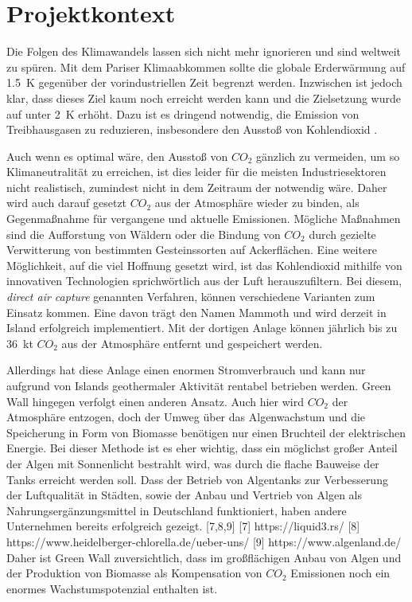 \section{Projektkontext}

Die Folgen des Klimawandels lassen sich nicht mehr ignorieren und sind weltweit zu spüren. Mit dem Pariser Klimaabkommen sollte die globale Erderwärmung auf \qty{1,5}{\kelvin} gegenüber der vorindustriellen Zeit begrenzt werden. Inzwischen ist jedoch klar, dass dieses Ziel kaum noch erreicht werden kann und die Zielsetzung wurde auf unter \qty{2}{\kelvin} erhöht. Dazu ist es dringend notwendig, die Emission von Treibhausgasen zu reduzieren, insbesondere den Ausstoß von Kohlendioxid \cite{Online2024.UebereinkommenVonParis}.

Auch wenn es optimal wäre, den Ausstoß von \(CO_2\) gänzlich zu vermeiden, um so Klimaneutralität zu erreichen, ist dies leider für die meisten Industriesektoren nicht realistisch, zumindest nicht in dem Zeitraum der notwendig wäre.
Daher wird auch darauf gesetzt \(CO_2\) aus der Atmosphäre wieder zu binden, als Gegenmaßnahme für vergangene und aktuelle Emissionen.
Mögliche Maßnahmen sind die Aufforstung von Wäldern oder die Bindung von \(CO_2\) durch gezielte Verwitterung von bestimmten Gesteinssorten auf Ackerflächen.
Eine weitere Möglichkeit, auf die viel Hoffnung gesetzt wird, ist das Kohlendioxid mithilfe von innovativen Technologien sprichwörtlich aus der Luft herauszufiltern.
Bei diesem, \textit{direct air capture} genannten Verfahren, können verschiedene Varianten zum Einsatz kommen.
Eine davon trägt den Namen Mammoth und wird derzeit in Island erfolgreich implementiert.
Mit der dortigen Anlage können jährlich bis zu \qty{36}{\kilo\tonne} \(CO_2\) aus der Atmosphäre entfernt und gespeichert werden.

Allerdings hat diese Anlage einen enormen Stromverbrauch und kann nur aufgrund von Islands geothermaler Aktivität rentabel betrieben werden. Green Wall hingegen verfolgt einen anderen Ansatz. Auch hier wird \(CO_2\) der Atmosphäre entzogen, doch der Umweg über das Algenwachstum und die Speicherung in Form von Biomasse benötigen nur einen Bruchteil der elektrischen Energie. Bei dieser Methode ist es eher wichtig, dass ein möglichst großer Anteil der Algen mit Sonnenlicht bestrahlt wird, was durch die flache Bauweise der Tanks erreicht werden soll. 
Dass der Betrieb von Algentanks zur Verbesserung der Luftqualität in Städten, sowie der Anbau und Vertrieb von Algen als Nahrungsergänzungsmittel in Deutschland funktioniert, haben andere Unternehmen bereits erfolgreich gezeigt. [7,8,9] 
[7] https://liquid3.rs/ 
[8] https://www.heidelberger-chlorella.de/ueber-uns/ 
[9] https://www.algenland.de/ 
Daher ist Green Wall zuversichtlich, dass im großflächigen Anbau von Algen und der Produktion von Biomasse als Kompensation von \(CO_2\) Emissionen noch ein enormes Wachstumspotenzial enthalten ist. 
